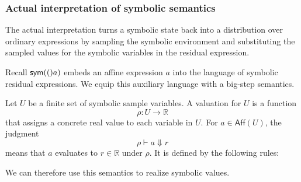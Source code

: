 \subsubsection{Actual interpretation of symbolic semantics}

The actual interpretation turns a symbolic state back into a distribution over
ordinary expressions by sampling the symbolic environment and substituting the
sampled values for the symbolic variables in the residual expression.  


Recall $\mathsf{sym}(()a)$ embeds an affine expression $a$ into the
language of symbolic residual expressions. We equip this auxiliary language
with a big-step semantics.

Let $U$ be a finite set of symbolic sample variables. A valuation for $U$
is a function
\[
  \rho : U \to \mathbb{R}
\]
that assigns a concrete real value to each variable in $U$. For
$a\in\mathsf{Aff}(U)$, the judgment
\[
  \rho \vdash a \Downarrow r
\]
means that $a$ evaluates to $r\in\mathbb{R}$ under $\rho$. It is defined
by the following rules:

We can therefore use this semantics to realize symbolic values. 

